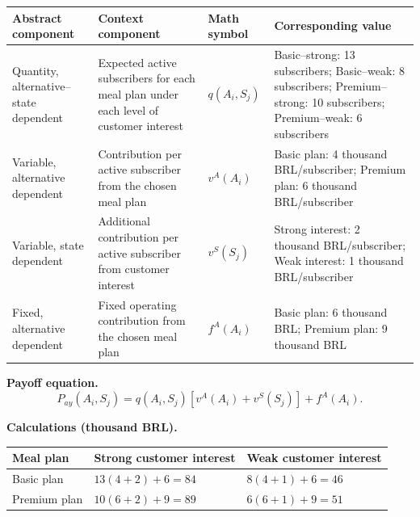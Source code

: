{		\begin{center}
			\small
			\begin{tabularx}{\textwidth}{
					>{\raggedright\arraybackslash}X
					>{\raggedright\arraybackslash}X
					>{\centering\arraybackslash}p{}
					>{\raggedright\arraybackslash}X
				}
				\toprule
				Abstract component & Context component & Math symbol & Corresponding value \\
				\midrule
				Quantity, alternative--state dependent
				&
				Expected active subscribers for each meal plan under each level of customer interest
				&
				$q(A_i,S_j)$
				&
				Basic--strong: 13 subscribers; Basic--weak: 8 subscribers; Premium--strong: 10 subscribers; Premium--weak: 6 subscribers
				\\
				
				Variable, alternative dependent
				&
				Contribution per active subscriber from the chosen meal plan
				&
				$v^A(A_i)$
				&
				Basic plan: 4 thousand BRL/subscriber; Premium plan: 6 thousand BRL/subscriber
				\\
				
				Variable, state dependent
				&
				Additional contribution per active subscriber from customer interest
				&
				$v^S(S_j)$
				&
				Strong interest: 2 thousand BRL/subscriber; Weak interest: 1 thousand BRL/subscriber
				\\
				
				Fixed, alternative dependent
				&
				Fixed operating contribution from the chosen meal plan
				&
				$f^A(A_i)$
				&
				Basic plan: 6 thousand BRL; Premium plan: 9 thousand BRL
				\\
				\bottomrule
			\end{tabularx}
		\end{center}
		
		\textbf{Payoff equation.}
		\[
		P_{ay}(A_i,S_j)
		=
		q(A_i,S_j)
		\left[
		v^A(A_i)+v^S(S_j)
		\right]
		+
		f^A(A_i).
		\]
		
		\textbf{Calculations (thousand BRL).}
		
		\begin{center}
			\begin{tabularx}{\textwidth}{
					>{\raggedright\arraybackslash}X
					>{\centering\arraybackslash}X
					>{\centering\arraybackslash}X
				}
				\toprule
				Meal plan & Strong customer interest & Weak customer interest \\
				\midrule
				Basic plan & $13(4+2)+6=84$ & $8(4+1)+6=46$ \\
				Premium plan & $10(6+2)+9=89$ & $6(6+1)+9=51$ \\
				\bottomrule
			\end{tabularx}
		\end{center}
		
}
